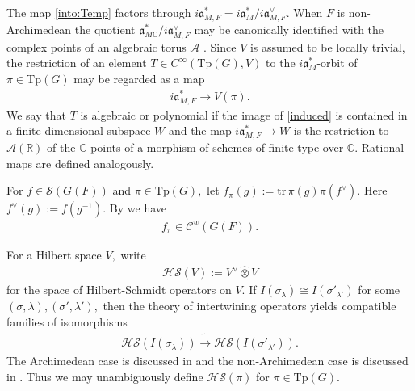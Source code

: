 \documentclass[12pt]{amsart}
\theoremstyle{remark}
\numberwithin{equation}{section}
\newcommand{\lto}{\longrightarrow}
\newcommand{\CC}{\mathbb{C}}
\newcommand{\RR}{\mathbb{R}}
\theoremstyle{definition}
\numberwithin{equation}{subsection}
\begin{document}
The map \eqref{into:Temp} factors through $i\mathfrak{a}_{M,F}^*=i\mathfrak{a}_{M}^\ast/i\mathfrak{a}_{M,F}^\vee.$  When $F$ is non-Archimedean the quotient $\mathfrak{a}_{M\CC}^\ast/i\mathfrak{a}_{M,F}^\vee$ may be canonically identified with the complex points of an algebraic torus $\mathcal{A}$ \cite[\S V.2.4]{Renard}.  Since $V$ is assumed to be locally trivial, the restriction of an element $T \in C^\infty(\mathrm{Tp}(G),V)$ to the $i\mathfrak{a}_{M}^\ast$-orbit of $\pi \in \mathrm{Tp}(G)$ may be regarded as a map
\begin{align} \label{induced}
i\mathfrak{a}_{M,F}^* \lto V(\pi).
\end{align}
We say that $T$ is algebraic or polynomial if the image of \eqref{induced} is contained in a finite dimensional subspace $W$ and the map $i\mathfrak{a}_{M,F}^* \to W$ 
is the restriction to $\mathcal{A}(\RR)$ of the $\CC$-points of a morphism of schemes of finite type over $\CC.$  Rational maps are defined analogously.     

For $f \in \mathcal{S}(G(F))$ and $\pi\in \mathrm{Tp}(G),$ let
$
    f_{\pi}(g):=\mathrm{tr}\,\pi(g)\pi(f^\vee).$
Here $f^\vee(g):=f(g^{-1}).$  By \cite[\S 2.13]{BP:GLn} we have
\begin{align} \label{fpi:weak}
    f_{\pi} \in \mathcal{C}^w(G(F)).
\end{align}

   For a Hilbert space $V,$ write
\begin{align*}
\mathcal{HS}(V):=V^\vee \widehat{\otimes }V
\end{align*}
for the space of Hilbert-Schmidt operators on $V.$
If $I(\sigma_\lambda) \cong I(\sigma'_{\lambda'})$ for some $(\sigma,\lambda), (\sigma',\lambda'),$ then the theory of intertwining operators yields compatible families of isomorphisms
\begin{align*}
\mathcal{HS}(I(\sigma_\lambda)) \tilde{\lto} \mathcal{HS}(I(\sigma'_{\lambda'})).
\end{align*}
The Archimedean case is discussed in \cite[\S II.(2.2)]{Arthur:HP:realreductive} and the non-Archimedean case is discussed in \cite[\S V.3]{Waldspurger:plancherel}.  
Thus we may unambiguously define $\mathcal{HS}(\pi)$ for $\pi \in \mathrm{Tp}(G).$
\end{document}
